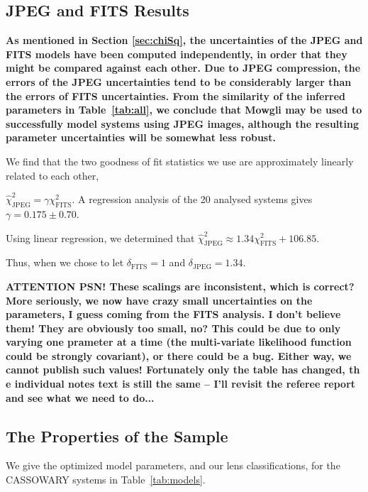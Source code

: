 \documentclass[iop]{emulateapj}
\def\chisq{\chi^2}
\def\rchisq{\hat{\chi}^2}
\def\theapplet{{\sc Mowgli}\xspace}
\def\ACHTUNG#1#2{{\bf ATTENTION {#1}! {#2}}}
\def\NEW#1{{\bf{#1}}}
\begin{document}

\subsection{JPEG and FITS Results}
\label{sec:results:JPEGvsFITS}

\NEW{As mentioned in Section \ref{sec:chiSq}, the uncertainties of the JPEG
and FITS models have been computed independently, in order that they might be
compared against each other.  Due to JPEG compression, the errors of the JPEG
uncertainties tend to be considerably larger than the errors of FITS
uncertainties. From the similarity of the inferred parameters in
Table~\ref{tab:all}, we conclude that \theapplet may be used to successfully
model systems using JPEG images, although the resulting parameter
uncertainties will be somewhat less robust.}

We find that the two goodness of fit statistics
we use are approximately linearly related to each other,

$\rchisq_\text{JPEG} = \gamma
\chi^2_\text{FITS}$. A regression analysis of the 20 analysed systems 
gives $\gamma = 0.175 \pm
0.70$. 

Using linear
regression, we determined that $\rchisq_\text{JPEG} \approx 1.34
\chisq_\text{FITS} + 106.85$. 

Thus, when we chose to let $\delta_\text{FITS} = 1$
and $\delta_\text{JPEG} = 1.34$.

\ACHTUNG{PSN}{These scalings are inconsistent, which is correct? More
seriously, we now have crazy small uncertainties on the parameters, I guess
coming from the FITS analysis. I don't believe them! They are obviously too
small, no? This could be due to only varying one prameter at a time (the
multi-variate likelihood function could be strongly covariant), or there could
be a bug. Either way, we cannot publish such values! Fortunately only the
table has changed, th e individual notes text is still the same -- I'll
revisit the referee report and see what we need to do...}


\subsection{The Properties of the Sample}
\label{sec:results:summary}

We give the optimized model parameters, and our lens classifications, for the
CASSOWARY systems in  Table~\ref{tab:models}.
\end{document}
